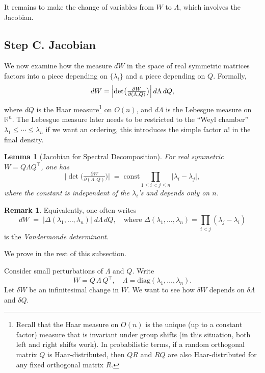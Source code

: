 \documentclass[letterpaper,11pt,oneside,reqno]{article}
\numberwithin{equation}{section}
\newtheorem{lemma}[proposition]{Lemma}
\theoremstyle{definition}
\newtheorem{remark}[proposition]{Remark}
\begin{document}
It remains to make the change of variables from \(W\) to \(\Lambda\), which involves the Jacobian.

\subsection{Step C. Jacobian}
\label{subsec:jacobian}

We now examine how the measure \(dW\) in the space of real symmetric matrices factors into a piece depending on \(\{\lambda_i\}\) and a piece depending on \(Q\).  Formally,
\[
  dW
  = \Bigl|\det\bigl(\tfrac{\partial W}{\partial(\Lambda,Q)}\bigr)\Bigr|
    \,d\Lambda\,dQ,
\]
where \(dQ\) is the Haar measure\footnote{Recall that the
	Haar measure on \(O(n)\) is the unique
	(up to a constant factor) measure that is invariant under
	group shifts (in this situation, both left and right shifts
	work). In probabilistic terms,
	if a random orthogonal matrix $Q$ is Haar-distributed,
	then $QR$ and $RQ$ are also Haar-distributed for any fixed orthogonal
matrix $R$.}
on \(O(n)\), and
\(d\Lambda\) is the Lebesgue measure on \(\mathbb{R}^n\).
The Lebesgue measure later needs to be restricted
to the ``Weyl chamber''
\(\lambda_1\le \cdots\le \lambda_n\) if we want an ordering,
this introduces the simple factor \(n!\) in the final density.


\begin{lemma}[Jacobian for Spectral Decomposition]
\label{lemma:Jacobian-GOE}
For real symmetric \(W=Q\Lambda Q^\top\), one has
\[
  \bigl|\det\bigl(\tfrac{\partial W}{\partial(\Lambda,Q)}\bigr)\bigr|
  \;=\;
	\mathrm{const}
  \prod_{1\le i<j\le n}
	\!\!
	\bigl|\lambda_i - \lambda_j\bigr|,
\]
where the constant is independent of the \(\lambda_i\)'s and
depends only on \(n\).
\end{lemma}

\begin{remark}
Equivalently, one often writes
\[
  dW
  \;=\;
  \bigl|\Delta(\lambda_1,\dots,\lambda_n)\bigr|\;
  d\Lambda\,dQ,
  \quad\text{where }
  \Delta(\lambda_1,\dots,\lambda_n)
  = \prod_{i<j}(\lambda_j-\lambda_i)
\]
is the \emph{Vandermonde determinant}.
\end{remark}

We prove  in the rest of this subsection.
\medskip

Consider small perturbations of \(\Lambda\) and \(Q\).  Write
\[
  W = Q\,\Lambda\,Q^\top,
  \quad
  \Lambda = \mathrm{diag}(\lambda_1,\dots,\lambda_n).
\]
Let \(\delta W\) be an infinitesimal change in \(W\). We want to see how \(\delta W\) depends on \(\delta\Lambda\) and \(\delta Q\).
\end{document}
